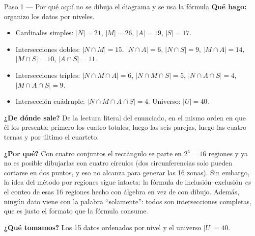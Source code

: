 \documentclass[11pt]{article}
\begin{document}
\begin{paso}{Paso 1 --- Por qué aquí no se dibuja el diagrama y se usa la fórmula}
\textbf{Qué hago:} organizo los datos por niveles.
\begin{itemize}[leftmargin=1.4em,itemsep=1pt]
\item Cardinales simples: $|N|=21$, $|M|=26$, $|A|=19$, $|S|=17$.
\item Intersecciones dobles: $|N\cap M|=15$, $|N\cap A|=6$, $|N\cap S|=9$, $|M\cap A|=14$, $|M\cap S|=10$,
$|A\cap S|=11$.
\item Intersecciones triples: $|N\cap M\cap A|=6$, $|N\cap M\cap S|=5$, $|N\cap A\cap S|=4$,
$|M\cap A\cap S|=9$.
\item Intersección cuádruple: $|N\cap M\cap A\cap S|=4$. Universo: $|U|=40$.
\end{itemize}

\textbf{¿De dónde sale?} De la lectura literal del enunciado, en el mismo orden en que él los presenta:
primero los cuatro totales, luego las seis parejas, luego las cuatro ternas y por último el cuarteto.

\textbf{¿Por qué?} Con cuatro conjuntos el rectángulo se parte en $2^4=16$ regiones y ya no es posible
dibujarlas con cuatro círculos (dos circunferencias solo pueden cortarse en dos puntos, y eso no alcanza
para generar las 16 zonas). Sin embargo, la idea del método por regiones sigue intacta: la fórmula de
inclusión--exclusión \emph{es} el conteo de esas 16 regiones hecho con álgebra en vez de con dibujo. Además,
ningún dato viene con la palabra ``solamente'': todos son intersecciones completas, que es justo el
formato que la fórmula consume.

\textbf{¿Qué tomamos?} Los 15 datos ordenados por nivel y el universo $|U|=40$.
\end{paso}
\end{document}
